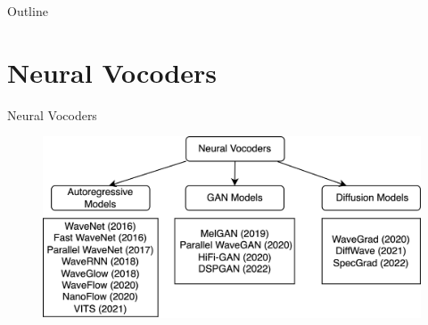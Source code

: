 
\usepackage{tikz}
\usetikzlibrary{arrows,shapes,positioning,shadows,trees}

\begin{frame}
\titlepage
\end{frame}
\begin{frame}{Outline}
	\tableofcontents
\end{frame}

\section{Neural Vocoders}
\begin{frame}{Neural Vocoders}
        \begin{figure}
    	\centering
    	\includegraphics[width=0.99\linewidth]{figs/vocoders.png}
    \end{figure}
\end{frame}

